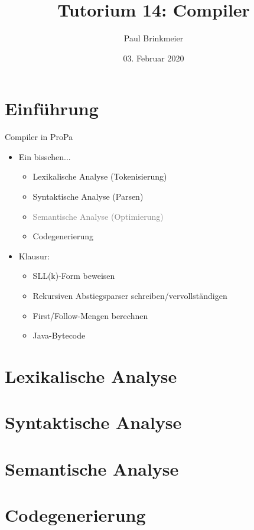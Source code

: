 \documentclass{beamer}
\title{Tutorium 14: Compiler}
\author{Paul Brinkmeier}
\institute{Tutorium Programmierparadigmen am KIT}
\date{03. Februar 2020}
\begin{document}
\begin{frame}
	\titlepage
\end{frame}

\section{Einführung}

\begin{frame}{Compiler in ProPa}
	\begin{itemize}
		\item Ein bisschen...
		\begin{itemize}
			\item Lexikalische Analyse (Tokenisierung)
			\item Syntaktische Analyse (Parsen)
			\item \textcolor{gray}{Semantische Analyse (Optimierung)}
			\item Codegenerierung
		\end{itemize}
		\pause
		\item Klausur:
		\begin{itemize}
			\item SLL(k)-Form beweisen
			\item Rekursiven Abstiegsparser schreiben/vervollständigen
			\item First/Follow-Mengen berechnen
			\item Java-Bytecode
		\end{itemize}
	\end{itemize}
\end{frame}


\section{Lexikalische Analyse}

\section{Syntaktische Analyse}

\section{Semantische Analyse}

\section{Codegenerierung}

\end{document}
